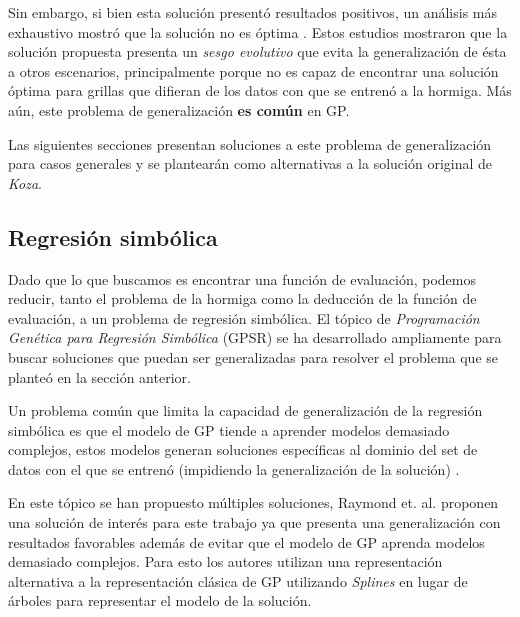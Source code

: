     Sin embargo, si bien esta solución presentó resultados positivos, un análisis más exhaustivo
    mostró que la solución no es óptima \autocite{kuscuEvolvingGeneralisedBehaviour1998}.
    Estos estudios mostraron que la solución propuesta presenta un \textit{sesgo evolutivo} que
    evita la generalización de ésta a otros escenarios, principalmente porque no es capaz de
    encontrar una solución óptima para grillas que difieran de los datos con que se entrenó a la
    hormiga.
    Más aún, este problema de generalización \textbf{es común} en GP.

    Las siguientes secciones presentan soluciones a este problema de generalización para casos 
    generales y se plantearán como alternativas a la solución original de \textit{Koza}.


  \subsection{Regresión simbólica}
    \label{sec:regresion-simb}
    Dado que lo que buscamos es encontrar una función de evaluación, podemos reducir, tanto el 
    problema de la hormiga como la deducción de la función de evaluación, a un problema de regresión
    simbólica.
    El tópico de \textit{Programación Genética para Regresión Simbólica} (GPSR) se ha desarrollado 
    ampliamente para buscar soluciones que puedan ser generalizadas para resolver el problema que se
    planteó en la sección anterior.

    Un problema común que limita la capacidad de generalización de la regresión simbólica es que
    el modelo de GP tiende a aprender modelos demasiado complejos, estos modelos generan 
    soluciones específicas al dominio del set de datos con el que se entrenó (impidiendo la 
    generalización de la solución) \cite{raymondMultiobjectiveGeneticProgramming2021}.

    En este tópico se han propuesto múltiples soluciones, Raymond et. al. 
    \cite{raymondAdaptiveWeightedSplines2020,raymondMultiobjectiveGeneticProgramming2021} proponen
    una solución de interés para este trabajo ya que presenta una generalización con resultados
    favorables además de evitar que el modelo de GP aprenda modelos demasiado complejos.
    Para esto los autores utilizan una representación alternativa a la representación clásica de
    GP utilizando \textit{Splines} en lugar de árboles para representar el modelo de la solución.
    
    
